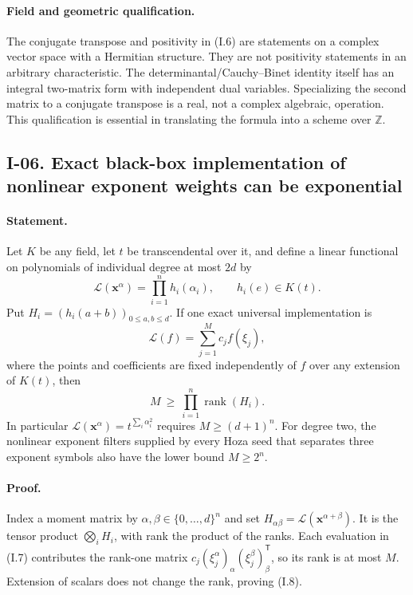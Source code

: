 \documentclass[11pt,a4paper]{article}
\theoremstyle{definition}\newtheorem{definition}{Definition}
\begin{document}
\paragraph{Field and geometric qualification.}
The conjugate transpose and positivity in (I.6) are statements on
a complex vector space with a Hermitian structure.  They are not
positivity statements in an arbitrary characteristic.  The
determinantal/Cauchy--Binet identity itself has an integral
two-matrix form with independent dual variables.  Specializing the
second matrix to a conjugate transpose is a real, not a complex
algebraic, operation.  This qualification is essential in translating
the formula into a scheme over $\mathbb Z$.

\subsection{I-06. Exact black-box implementation of nonlinear exponent weights can be exponential}
\label{I-06}

\paragraph{Statement.}
Let $K$ be any field, let $t$ be transcendental over it, and define
a linear functional on polynomials of individual degree at most $2d$
by
\[
 \mathcal L(\mathbf x^\alpha)=\prod_{i=1}^n h_i(\alpha_i),
 \qquad h_i(e)\in K(t).
\]
Put $H_i=(h_i(a+b))_{0\le a,b\le d}$.
If one exact universal implementation is
\[
 \mathcal L(f)=\sum_{j=1}^M c_j f(\xi_j),
\tag{I.7}
\]
where the points and coefficients are fixed independently of $f$
over any extension of $K(t)$, then
\[
 M\ \ge\ \prod_{i=1}^n\operatorname{rank}(H_i).
\tag{I.8}
\]
In particular $\mathcal L(\mathbf x^\alpha)=
t^{\sum_i\alpha_i^2}$ requires $M\ge(d+1)^n$.
For degree two, the nonlinear exponent filters supplied by every
Hoza seed that separates three exponent symbols also have the
lower bound $M\ge2^n$.

\paragraph{Proof.}
Index a moment matrix by
$\alpha,\beta\in\{0,\ldots,d\}^n$ and set
$H_{\alpha\beta}=\mathcal L(\mathbf x^{\alpha+\beta})$.
It is the tensor product $\bigotimes_iH_i$, with rank the product
of the ranks.  Each evaluation in (I.7) contributes the rank-one
matrix $c_j(\xi_j^\alpha)_\alpha(\xi_j^\beta)_\beta^{\mathsf T}$,
so its rank is at most $M$.  Extension of scalars does not change
the rank, proving (I.8).
\end{document}
